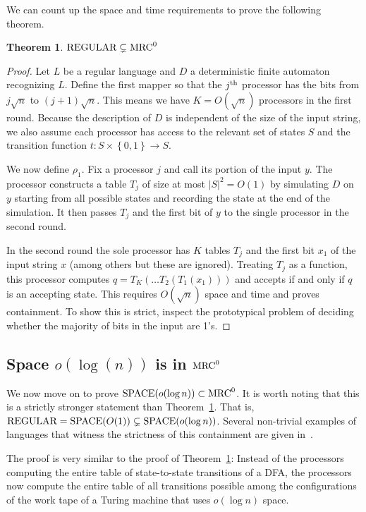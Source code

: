 \documentclass[11pt]{article}
\newtheorem{thm}{Theorem}
\theoremstyle{definition}
\theoremstyle{remark}
\newcommand{\mrc}{\textup{MRC}}
\newcommand{\SPACE}{\textup{SPACE}}
\begin{document}
We can count up the space and time requirements to prove the following theorem.

\begin{thm}\label{thm:reg}
   $\textup{REGULAR} \subsetneq \mrc^0$
\end{thm}

\begin{proof}
Let $L$ be a regular language and $D$ a deterministic finite automaton
recognizing $L$. Define the first mapper so
that the $j^\textup{th}$ processor has the bits from $j\sqrt{n}$ to
$(j+1)\sqrt{n}$.  This means we have $K = O(\sqrt{n})$ processors in the first
round. Because the description of $D$ is independent of the size of the input
string, we also assume each processor has access to the relevant set of states
$S$ and the transition function $t: S \times \left \{ 0,1 \right \} \to S$.

We now define $\rho_1$.  Fix a
processor $j$ and call its portion of the input $y$. The processor constructs a
table $T_j$ of size at most $|S|^2 = O(1)$ by simulating $D$ on $y$ starting
from all possible states and recording the state at the end of the simulation.
It then passes $T_j$ and the first bit of $y$ to the single processor in the
second round.

In the second round the sole processor has $K$ tables $T_j$ and the first bit
$x_1$ of the input string $x$ (among others but these are ignored). Treating
$T_j$ as a function, this processor computes $q = T_K(\dots T_2(T_1(x_1)))$ and
accepts if and only if $q$ is an accepting state. This requires $O(\sqrt{n})$
space and time and proves containment. To show this is strict, inspect the
prototypical problem of deciding whether the majority of bits in the input are
1's.  
\end{proof}


\subsection{Space $o(\log(n))$ is in $\mrc^0$} \label{sec:sublogspace}

We now move on to prove $\SPACE(o(\log n))\subset \mrc^0$.  It is worth noting
that this is a strictly stronger statement than Theorem~\ref{thm:reg}.  That
is, $\textup{REGULAR}=\SPACE(O(1))\subsetneq \SPACE(o(\log n))$.  Several
non-trivial examples of languages that witness the strictness of this
containment are given in~\cite{szepietowski1994turing}.    

The proof is very similar to the proof of Theorem~\ref{thm:reg}:  Instead of
the processors computing the entire table of state-to-state transitions of a
DFA, the processors now compute the entire table of all transitions possible
among the configurations of the work tape of a Turing machine that uses $o(\log
n)$ space.
\end{document}

